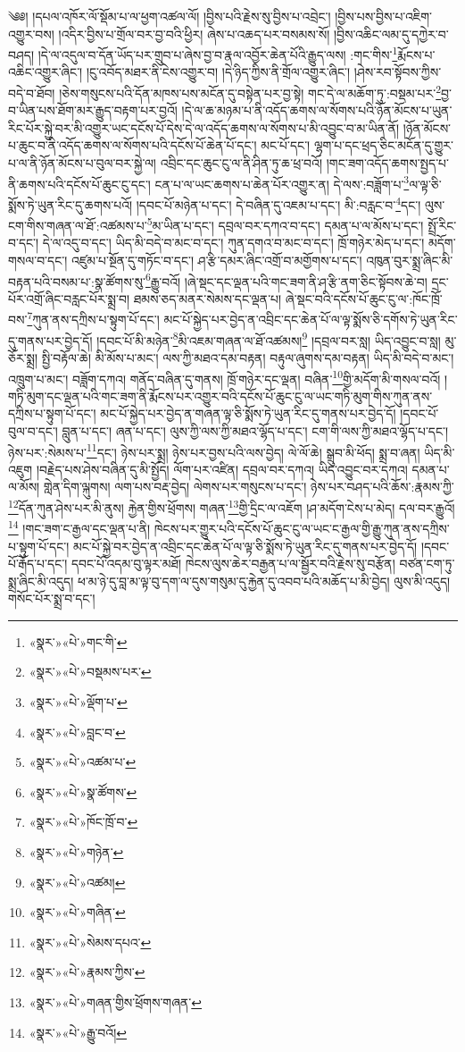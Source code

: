 ༄༅། །དཔལ་འཁོར་ལོ་སྡོམ་པ་ལ་ཕྱག་འཚལ་ལོ། །བྱིས་པའི་རྗེས་སུ་བྱིས་པ་འབྲེང་། །བྱིས་པས་བྱིས་པ་འཇིག་འགྱུར་བས། །འདིར་བྱིས་པ་གྲོལ་བར་བྱ་བའི་ཕྱིར། ཞེས་པ་འཆད་པར་བསམས་སོ། །བྱིས་འཆིང་ལམ་དུ་དཀྱེར་བ་བཤད། །དེ་ལ་འདུལ་བ་དོན་ཡོད་པར་གྲུབ་པ་ཞེས་བྱ་བ་རྣལ་འབྱོར་ཆེན་པོའི་རྒྱུད་ལས། :གང་གིས་\footnote{«སྣར་»«པེ་»གང་གི་}རྨོངས་པ་འཆིང་འགྱུར་ཞིང་། །ངུ་འབོད་མཐར་ནི་ངེས་འགྱུར་བ། །དེ་ཉིད་ཀྱིས་ནི་གྲོལ་འགྱུར་ཞིང་། །ཤེས་རབ་སྟོབས་ཀྱིས་བདེ་བ་ཐོབ། །ཅེས་གསུངས་པའི་དོན་མཁས་པས་མངོན་དུ་བསྟེན་པར་བྱ་སྟེ། གང་དེ་ལ་མཆོག་ཏུ་:བསྡམ་པར་\footnote{«སྣར་»«པེ་»བསྡམས་པར་}བྱ་བ་ཡིན་པས་ཐོག་མར་རྒྱུད་བརྟག་པར་བྱའོ། །དེ་ལ་ཆ་མཉམ་པ་ནི་འདོད་ཆགས་ལ་སོགས་པའི་ཉོན་མོངས་པ་ཡུན་རིང་པོར་སྐྱེ་བར་མི་འགྱུར་ཡང་དངོས་པོ་དེས་དེ་ལ་འདོད་ཆགས་ལ་སོགས་པ་མི་འབྱུང་བ་མ་ཡིན་ནོ། །ཉོན་མོངས་པ་ཆུང་བ་ནི་འདོད་ཆགས་ལ་སོགས་པའི་དངོས་པོ་ཆེན་པོ་དང་། མང་པོ་དང་། ལྷག་པ་དང་ཕྲད་ཅིང་མངོན་དུ་གྱུར་པ་ལ་ནི་ཉོན་མོངས་པ་བུལ་བར་སྐྱེ་ལ། འབྲིང་དང་ཆུང་ངུ་ལ་ནི་ཤིན་ཏུ་ཆ་ཕྲ་བའོ། །གང་ཟག་འདོད་ཆགས་སྤྱད་པ་ནི་ཆགས་པའི་དངོས་པོ་ཆུང་ངུ་དང་། ངན་པ་ལ་ཡང་ཆགས་པ་ཆེན་པོར་འགྱུར་ན། དེ་ལས་:བཟློག་པ་\footnote{«སྣར་»«པེ་»ལྡོག་པ་}ལ་ལྟ་ཅི་སྨོས་ཏེ་ཡུན་རིང་དུ་ཆགས་པའོ། །དབང་པོ་མཉེན་པ་དང་། དེ་བཞིན་དུ་འཇམ་པ་དང་། མི་:བརླང་བ་\footnote{«སྣར་»«པེ་»བླང་བ་}དང་། ལུས་ངག་གིས་གཞན་ལ་ཐོ་:འཚམས་པ་\footnote{«སྣར་»«པེ་»འཚམ་པ་}མ་ཡིན་པ་དང་། དབྲལ་བར་དཀའ་བ་དང་། དམན་པ་ལ་མོས་པ་དང་། སྤྲོ་རིང་བ་དང་། དེ་ལ་འདུ་བ་དང་། ཡིད་མི་བདེ་བ་མང་བ་དང་། ཀུན་དགའ་བ་མང་བ་དང་། ཁྲོ་གཉེར་མེད་པ་དང་། མདོག་གསལ་བ་དང་། འཛུམ་པ་སྔོན་དུ་གཏོང་བ་དང་། ཤ་རྩི་དམར་ཞིང་འགྲོ་བ་མགྱོགས་པ་དང་། འཁུན་བུར་སྨྲ་ཞིང་མི་བརྟན་པའི་བསམ་པ་:སྣ་ཚོགས་སུ་\footnote{«སྣར་»«པེ་»སྣ་ཚོགས་}རྒྱུ་བའོ། །ཞེ་སྡང་དང་ལྡན་པའི་གང་ཟག་ནི་ཤ་རྩི་ནག་ཅིང་སྟོབས་ཆེ་བ། དྲང་པོར་འགྲོ་ཞིང་བརླང་པོར་སྨྲ་བ། ཐམས་ཅད་མནར་སེམས་དང་ལྡན་པ། ཞེ་སྡང་བའི་དངོས་པོ་ཆུང་ངུ་ལ་:ཁོང་ཁྲོ་བས་\footnote{«སྣར་»«པེ་»ཁོང་ཁྲོ་བ་}ཀུན་ནས་དཀྲིས་པ་སྟུག་པོ་དང་། མང་པོ་སྐྱེད་པར་བྱེད་ན་འབྲིང་དང་ཆེན་པོ་ལ་ལྟ་སྨོས་ཅི་དགོས་ཏེ་ཡུན་རིང་དུ་གནས་པར་བྱེད་དོ། །དབང་པོ་མི་མཉེན་\footnote{«སྣར་»«པེ་»གཉེན་}མི་འཇམ་གཞན་ལ་ཐོ་འཚམས།\footnote{«སྣར་»«པེ་»འཚམ།} །དབྲལ་བར་སླ། ཡིད་འབྱུང་བ་སླ། མུ་ཅོར་སྨྲ། སྤྱི་བརྟོལ་ཆེ། མི་མོས་པ་མང་། ལས་ཀྱི་མཐའ་དམ་བརྟན། བརྟུལ་ཞུགས་དམ་བརྟན། ཡིད་མི་བདེ་བ་མང་། འཁྲུག་པ་མང་། བཟློག་དཀའ། གནོད་བཞིན་དུ་གནས། ཁྲོ་གཉེར་དང་ལྡན། བཞིན་\footnote{«སྣར་»«པེ་»གཞིན་}གྱི་མདོག་མི་གསལ་བའོ། །གཏི་མུག་དང་ལྡན་པའི་གང་ཟག་ནི་རྨོངས་པར་འགྱུར་བའི་དངོས་པོ་ཆུང་ངུ་ལ་ཡང་གཏི་མུག་གིས་ཀུན་ནས་དཀྲིས་པ་སྟུག་པོ་དང་། མང་པོ་སྐྱེད་པར་བྱེད་ན་གཞན་ལྟ་ཅི་སྨོས་ཏེ་ཡུན་རིང་དུ་གནས་པར་བྱེད་དོ། །དབང་པོ་བུལ་བ་དང་། བླུན་པ་དང་། ཞན་པ་དང་། ལུས་ཀྱི་ལས་ཀྱི་མཐའ་ལྷོད་པ་དང་། ངག་གི་ལས་ཀྱི་མཐའ་ལྷོད་པ་དང་། ཉེས་པར་:སེམས་པ་\footnote{«སྣར་»«པེ་»སེམས་དཔའ་}དང་། ཉེས་པར་སྨྲ། ཉེས་པར་བྱས་པའི་ལས་བྱེད། ལེ་ལོ་ཆེ། སྒྲུབ་མི་ཕོད། སྨྲ་བ་ཞན། ཡིད་མི་འཇུག །བརྗེད་པས་ཤེས་བཞིན་དུ་མི་སྤྱོད། ལོག་པར་འཛིན། དབྲལ་བར་དཀའ། ཡིད་འབྱུང་བར་དཀའ། དམན་པ་ལ་མོས། གླེན་དིག་ལྐུགས། ལག་པས་བརྡ་བྱེད། ལེགས་པར་གསུངས་པ་དང་། ཉེས་པར་བཤད་པའི་ཆོས་:རྣམས་ཀྱི་\footnote{«སྣར་»«པེ་»རྣམས་ཀྱིས་}དོན་ཀུན་ཤེས་པར་མི་ནུས། རྐྱེན་གྱིས་ཕྲོགས། གཞན་\footnote{«སྣར་»«པེ་»གཞན་གྱིས་ཕྲོགས་གཞན་}གྱི་དྲིང་ལ་འཇོག །ཤ་མདོག་ངེས་པ་མེད། དལ་བར་རྒྱུའོ།\footnote{«སྣར་»«པེ་»རྒྱུ་བའོ།} །གང་ཟག་ང་རྒྱལ་དང་ལྡན་པ་ནི། ཁེངས་པར་གྱུར་པའི་དངོས་པོ་ཆུང་ངུ་ལ་ཡང་ང་རྒྱལ་གྱི་རྒྱུ་ཀུན་ནས་དཀྲིས་པ་སྟུག་པོ་དང་། མང་པོ་སྐྱེ་བར་བྱེད་ན་འབྲིང་དང་ཆེན་པོ་ལ་ལྟ་ཅི་སྨོས་ཏེ་ཡུན་རིང་དུ་གནས་པར་བྱེད་དོ། །དབང་པོ་རྒོད་པ་དང་། དབང་པོ་འདམ་བུ་ལྟར་མཐོ། ཁེངས་ལུས་ཆེར་བརྒྱན་པ་ལ་སྦྱོར་བའི་རྗེས་སུ་བརྩོན། བཙན་ངག་ཏུ་སྨྲ་ཞིང་མི་འདུད། ཕ་མ་ཉེ་དུ་བླ་མ་ལྟ་བུ་དག་ལ་དུས་གསུམ་དུ་རྐྱེན་དུ་འབབ་པའི་མཆོད་པ་མི་བྱེད། ལུས་མི་འདུད། གསོང་པོར་སྨྲ་བ་དང་། 